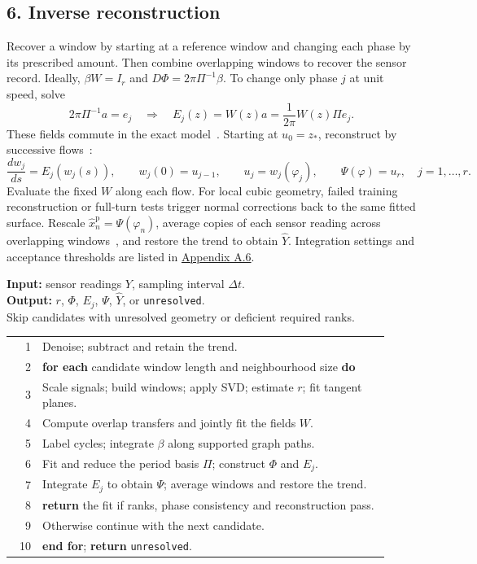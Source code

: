 \documentclass[11pt,a4paper]{article}
\begin{document}
\subsection*{6. Inverse reconstruction}
Recover a window by starting at a reference window and changing each phase
by its prescribed amount. Then combine overlapping windows to recover
the sensor record.
Ideally, $\beta W=I_r$ and $D\Phi=2\pi\Pi^{-1}\beta$.
To change only phase $j$ at unit speed, solve
\[
2\pi\Pi^{-1}a=e_j
\quad\Longrightarrow\quad
E_j(z)=W(z)a=\frac{1}{2\pi}W(z)\Pi e_j.
\]
These fields commute in the exact model~\citep{Giannakis2019}.
Starting at $u_0=z_*$, reconstruct by successive flows~\citep[Theorem~9.46]{Lee2012}:
\[
\frac{dw_j}{ds}=E_j(w_j(s)),\qquad w_j(0)=u_{j-1},\qquad
u_j=w_j(\varphi_j),\qquad \Psi(\varphi)=u_r,\quad j=1,\ldots,r.
\]
Evaluate the fixed $W$ along each flow.
For local cubic geometry, failed training reconstruction or full-turn tests trigger
normal corrections back to the same fitted surface.
Rescale $\widehat x_n^{\mathrm p}=\Psi(\varphi_n)$, average copies of each
sensor reading across overlapping windows~\citep{GrothGhil2011}, and
restore the trend to obtain $\widehat Y$.
Integration settings and acceptance thresholds are listed in
\hyperref[app:reconstruction]{Appendix A.6}.

\FloatBarrier
\begin{algorithm}[H]
\caption{TorusFlow}
\small
\textbf{Input:} sensor readings $Y$, sampling interval $\Delta t$.\\
\textbf{Output:} $r$, $\Phi$, $E_j$, $\Psi$, $\widehat Y$, or \texttt{unresolved}.\\
Skip candidates with unresolved geometry or deficient required ranks.
\par\smallskip
\begin{tabular}{@{}r@{\quad}p{0.92\linewidth}@{}}
1 & Denoise; subtract and retain the trend.\\
2 & \textbf{for each} candidate window length and neighbourhood size \textbf{do}\\
3 & \quad Scale signals; build windows; apply SVD; estimate $r$; fit tangent planes.\\
4 & \quad Compute overlap transfers and jointly fit the fields $W$.\\
5 & \quad Label cycles; integrate $\beta$ along supported graph paths.\\
6 & \quad Fit and reduce the period basis $\Pi$; construct $\Phi$ and $E_j$.\\
7 & \quad Integrate $E_j$ to obtain $\Psi$; average windows and restore the trend.\\
8 & \quad \textbf{return} the fit if ranks, phase consistency and reconstruction pass.\\
9 & \quad Otherwise continue with the next candidate.\\
10 & \textbf{end for}; \textbf{return} \texttt{unresolved}.\\
\end{tabular}
\end{algorithm}
\end{document}
